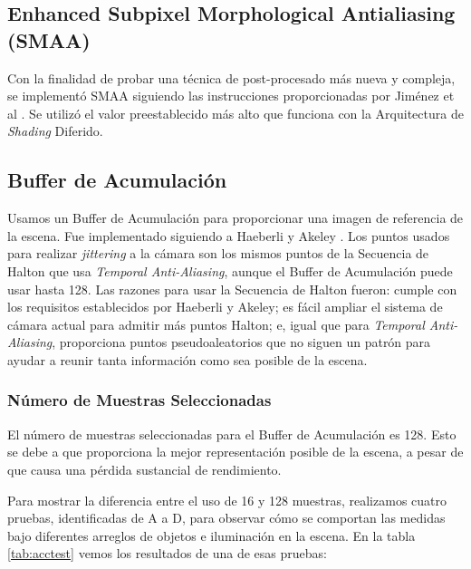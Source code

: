 \documentclass[pregrado]{tesis-usb} %
\begin{document}
\subsection{Enhanced Subpixel Morphological Antialiasing (SMAA)}
Con la finalidad de probar una técnica de post-procesado más nueva y compleja, se implementó SMAA siguiendo las instrucciones proporcionadas por Jiménez et al \cite{Jimenez2012}. Se utilizó el valor preestablecido más alto que funciona con la Arquitectura de \textit{Shading} Diferido.

\subsection{Buffer de Acumulación}
Usamos un Buffer de Acumulación para proporcionar una imagen de referencia de la escena. Fue implementado siguiendo a Haeberli y Akeley \cite{Haeberli1990}. Los puntos usados para realizar \textit{jittering} a la cámara son los mismos puntos de la Secuencia de Halton que usa \textit{Temporal Anti-Aliasing}, aunque el Buffer de Acumulación puede usar hasta 128. Las razones para usar la Secuencia de Halton fueron: cumple con los requisitos establecidos por Haeberli y Akeley; es fácil ampliar el sistema de cámara actual para admitir más puntos Halton; e, igual que para \textit{Temporal Anti-Aliasing}, proporciona puntos pseudoaleatorios que no siguen un patrón para ayudar a reunir tanta información como sea posible de la escena.

\subsubsection{Número de Muestras Seleccionadas}
El número de muestras seleccionadas para el Buffer de Acumulación es 128. Esto se debe a que proporciona la mejor representación posible de la escena, a pesar de que causa una pérdida sustancial de rendimiento.

Para mostrar la diferencia entre el uso de 16 y 128 muestras, realizamos cuatro pruebas, identificadas de A a D, para observar cómo se comportan las medidas bajo diferentes arreglos de objetos e iluminación en la escena. En la tabla \ref{tab:acctest} vemos los resultados de una de esas pruebas:
\end{document}
